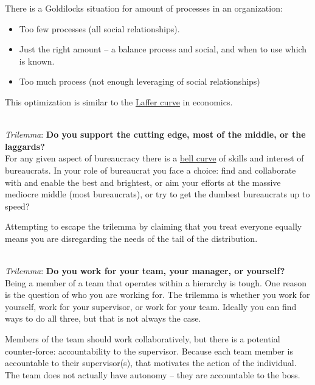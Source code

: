 There is a Goldilocks situation for amount of processes in an organization:
\begin{itemize}
    \item Too few processes (all social relationships).
    \item Just the right amount -- a balance process and social, and when to use which is known.
    \item Too much process (not enough leveraging of social relationships)
\end{itemize}
This optimization is similar to the \href{https://en.wikipedia.org/wiki/Laffer_curve}{Laffer curve} in economics.

\ \\

\textit{Trilemma}: \textbf{Do you support the cutting edge, most of the middle, or the laggards?}\\
For any given aspect of bureaucracy there is a \href{https://en.wikipedia.org/wiki/Normal_distribution}{bell curve} of skills and interest of bureaucrats. In your role of bureaucrat you face a choice: find and collaborate with and enable the best and brightest, or aim your efforts at the massive mediocre middle (most bureaucrats), or try to get the dumbest bureaucrats up to speed? 

Attempting to escape the trilemma by claiming that you treat everyone equally means you are disregarding the needs of the tail of the distribution. 

\ \\

\textit{Trilemma}: \textbf{Do you work for your team, your manager, or yourself?} \\
Being a member of a team that operates within a hierarchy is tough. One reason is the question of who you are working for. The trilemma is whether you work for yourself, work for your supervisor, or work for your team.  Ideally you can find ways to do all three, but that is not always the case. 

Members of the team should work collaboratively, but there is a potential counter-force: accountability to the supervisor. Because each team member is accountable to their supervisor(s), that motivates the action of the individual. The team does not actually have autonomy -- they are accountable to the boss.

